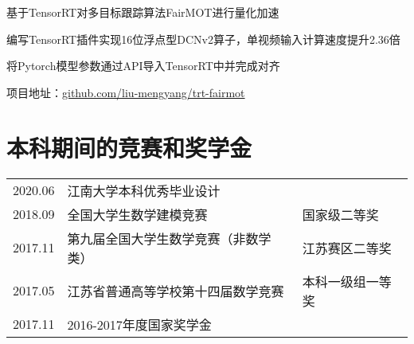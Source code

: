 \documentclass[]{deedy-resume-openfont}
\begin{document}
\begin{minipage}[t]{0.77\textwidth}
	\begin{tightemize}
		\item 基于TensorRT对多目标跟踪算法FairMOT进行量化加速
		\item 编写TensorRT插件实现16位浮点型DCNv2算子，单视频输入计算速度提升2.36倍
		\item 将Pytorch模型参数通过API导入TensorRT中并完成对齐
		\item 项目地址：\href{https://github.com/liu-mengyang/trt-fairmot}{github.com/liu-mengyang/trt-fairmot}
	\end{tightemize}
	\sectionsep


	\section{本科期间的竞赛和奖学金}
    \begin{tabular}{lll}
		2020.06 & 江南大学本科优秀毕业设计 & \\
        2018.09 & 全国大学生数学建模竞赛 & 国家级二等奖 \\
        2017.11 & 第九届全国大学生数学竞赛（非数学类） & 江苏赛区二等奖 \\
        2017.05 & 江苏省普通高等学校第十四届数学竞赛 & 本科一级组一等奖\\
        2017.11 & 2016-2017年度国家奖学金 & \\
	\end{tabular}
    \sectionsep
\end{minipage}
\end{document}
